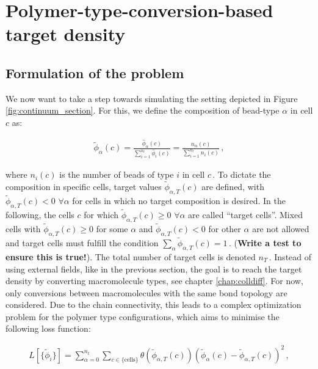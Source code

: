 \documentclass[bachelor,       %
               twoside,        %
               BCOR10mm,       %
               ngerman, english %
               ]{GAUBM}
\begin{document}
\chapter{Polymer-type-conversion-based target density}
\section{Formulation of the problem}
We now want to take a step towards simulating the setting depicted in Figure \ref{fig:continuum_section}. For this, we define the composition of bead-type $\alpha$ in cell $c$ as:

\begin{align}
    \tilde\phi_\alpha(c)=\frac{\hat\phi_\alpha(c)}{\sum_{i=1}^{n_t}\hat\phi_i(c)}=\frac{n_\alpha(c)}{\sum_{i=1}^{n_t}n_i(c)}\,,
\end{align}



where $n_i(c)$ is the number of beads of type $i$ in cell $c\,.$ To dictate the composition in specific cells, target values $\tilde\phi_{\alpha,T}(c)$ are defined, with $\tilde\phi_{\alpha,T}(c)<0$ $\forall\alpha$ for cells in which no target composition is desired. In the following, the cells $c$ for which $\tilde\phi_{\alpha,T}(c)\ge 0$ $\forall\alpha$ are called \enquote{target cells}. Mixed cells with $\tilde\phi_{\alpha,T}(c)\ge 0$ for some $\alpha$ and $\tilde\phi_{\alpha,T}(c)<0$ for other $\alpha$ are not allowed and target cells must fulfill the condition $\sum_\alpha\tilde\phi_{\alpha,T}(c)=1\, .$  (\textbf{Write a test to ensure this is true!}). The total number of target cells is denoted $n_T\,.$ Instead of using external fields, like in the previous section, the goal is to reach the target density by converting macromolecule types, see chapter \ref{chap:colldiff}. For now, only conversions between macromolecules with the same bond topology are considered. Due to the chain connectivity, this leads to a complex optimization problem for the polymer type configurations, which aims to minimise the following loss function:

\begin{align}
    L[\{\tilde\phi_i\}]=\sum_{\alpha=0}^{n_t}\sum_{c\in \{\text{cells}\}}\theta(\tilde{\phi}_{\alpha,T}(c))\left(\tilde{\phi}_\alpha(c)-\tilde{\phi}_{\alpha,T}(c)\right)^2\,,
    \label{eq:lossfunction}
\end{align}
\end{document}

